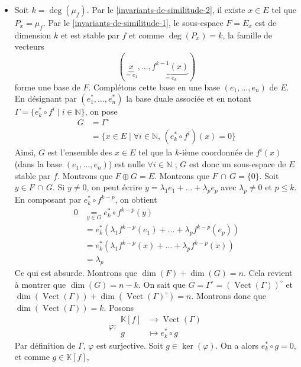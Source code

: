 	\begin{demonstration}
		\begin{itemize}
			\item {} Soit $k = \deg(\mu_f)$. Par le \cref{invariants-de-similitude-2}, il existe $x \in E$ tel que $P_x = \mu_f$. Par le \cref{invariants-de-similitude-1}, le sous-espace $F = E_x$ est de dimension $k$ et est stable par $f$ et comme $\deg(P_x) = k$, la famille de vecteurs
			\[ (\underbrace{x}_{= e_1}, \dots, \underbrace{f^{k-1}(x)}_{= e_k}) \]
			forme une base de $F$. Complétons cette base en une base $(e_1, \dots, e_n)$ de $E$. En désignant par $(e_1^*, \dots, e_n^*)$ la base duale associée et en notant $\Gamma = \{ e_k^* \circ f^i \mid i \in \mathbb{N} \}$, on pose
			\begin{align*}
				G &= \Gamma^\circ \\
				&= \{ x \in E \mid \forall i \in \mathbb{N}, \, (e_k^* \circ f^i)(x) = 0 \}
			\end{align*}
			Ainsi, $G$ est l'ensemble des $x \in E$ tel que la $k$-ième coordonnée de $f^i(x)$ (dans la base $(e_1, \dots, e_n)$)  est nulle $\forall i \in \mathbb{N}$ ; $G$ est donc un sous-espace de $E$ stable par $f$. Montrons que $F \oplus G = E$.
			\newpar
			Montrons que $F \, \cap \, G = \{ 0 \}$. Soit $y \in F \, \cap \, G$. Si $y \neq 0$, on peut écrire $y = \lambda_1 e_1 + \dots + \lambda_p e_p$ avec $\lambda_p \neq 0$ et $p \leq k$. En composant par $e_k^* \circ f^{k-p}$, on obtient
			\begin{align*}
				0 &\underset{y \in G}{=} e_k^* \circ f^{k-p}(y) \\
				&= e_k^* (\lambda_1 f^{k-p}(e_1) + \dots + \lambda_p f^{k-p}(e_p)) \\
				&= e_k^* (\lambda_1 f^{k-p}(x) + \dots + \lambda_p f^{k-p}(x)) \\
				&= \lambda_p
			\end{align*}
			Ce qui est absurde.
			\newpar
			Montrons que $\dim(F) + \dim(G) = n$. Cela revient à montrer que $\dim(G) = n - k$. On sait que $G = \Gamma^\circ = (\operatorname{Vect}(\Gamma))^\circ$ et $\dim(\operatorname{Vect}(\Gamma)) + \dim(\operatorname{Vect}(\Gamma)^\circ) = n$. Montrons donc que $\dim(\operatorname{Vect}(\Gamma)) = k$. Posons
			\[
			\varphi :
			\begin{array}{cl}
				\mathbb{K}[f] &\rightarrow \operatorname{Vect}(\Gamma) \\
				g &\mapsto e_k^* \circ g
			\end{array}
			\]
			Par définition de $\Gamma$, $\varphi$ est surjective. Soit $g \in \ker(\varphi)$. On a alors $e_k^* \circ g = 0$, et comme $g \in \mathbb{K}[f]$,

\end{itemize}
\end{demonstration}
